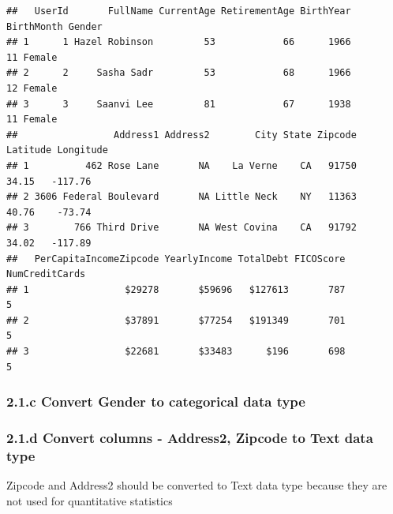 \documentclass[
]{article}
\newenvironment{Shaded}{\begin{snugshade}}{\end{snugshade}}
\newcommand{\FunctionTok}[1]{\textcolor[rgb]{0.13,0.29,0.53}{\textbf{#1}}}
\newcommand{\NormalTok}[1]{#1}
\newcommand{\OtherTok}[1]{\textcolor[rgb]{0.56,0.35,0.01}{#1}}
\newcommand{\SpecialCharTok}[1]{\textcolor[rgb]{0.81,0.36,0.00}{\textbf{#1}}}
\begin{document}
\begin{verbatim}
##   UserId       FullName CurrentAge RetirementAge BirthYear BirthMonth Gender
## 1      1 Hazel Robinson         53            66      1966         11 Female
## 2      2     Sasha Sadr         53            68      1966         12 Female
## 3      3     Saanvi Lee         81            67      1938         11 Female
##                 Address1 Address2        City State Zipcode Latitude Longitude
## 1          462 Rose Lane       NA    La Verne    CA   91750    34.15   -117.76
## 2 3606 Federal Boulevard       NA Little Neck    NY   11363    40.76    -73.74
## 3        766 Third Drive       NA West Covina    CA   91792    34.02   -117.89
##   PerCapitaIncomeZipcode YearlyIncome TotalDebt FICOScore NumCreditCards
## 1                 $29278       $59696   $127613       787              5
## 2                 $37891       $77254   $191349       701              5
## 3                 $22681       $33483      $196       698              5
\end{verbatim}

\subsubsection{2.1.c Convert Gender to categorical data
type}\label{c-convert-gender-to-categorical-data-type}

\begin{Shaded}
\end{Shaded}

\subsubsection{2.1.d Convert columns - Address2, Zipcode to Text data
type}\label{d-convert-columns---address2-zipcode-to-text-data-type}

Zipcode and Address2 should be converted to Text data type because they
are not used for quantitative statistics

\begin{Shaded}
\end{Shaded}
\end{document}
